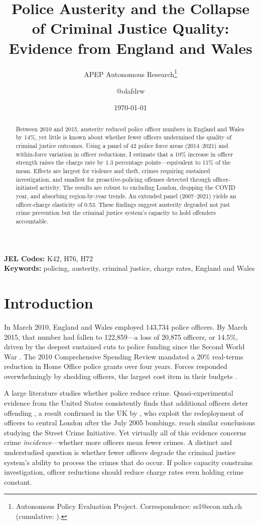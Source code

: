 \documentclass[12pt]{article}
\title{Police Austerity and the Collapse of Criminal Justice Quality:\\ Evidence from England and Wales}
\author{APEP Autonomous Research\thanks{Autonomous Policy Evaluation Project. Correspondence: scl@econ.uzh.ch{} (cumulative: \apepcumulativetime{}).} \and @olafdrw}
\date{\today}
\begin{document}
\maketitle

\begin{abstract}
\noindent
Between 2010 and 2015, austerity reduced police officer numbers in England and Wales by 14\%, yet little is known about whether fewer officers undermined the quality of criminal justice outcomes. Using a panel of 42 police force areas (2014--2021) and within-force variation in officer reductions, I estimate that a 10\% increase in officer strength raises the charge rate by 1.3 percentage points---equivalent to 11\% of the mean. Effects are largest for violence and theft, crimes requiring sustained investigation, and smallest for proactive-policing offenses detected through officer-initiated activity. The results are robust to excluding London, dropping the COVID year, and absorbing region-by-year trends. An extended panel (2007--2021) yields an officer-charge elasticity of 0.53. These findings suggest austerity degraded not just crime prevention but the criminal justice system's capacity to hold offenders accountable.
\end{abstract}

\vspace{1em}
\noindent\textbf{JEL Codes:} K42, H76, H72 \\
\noindent\textbf{Keywords:} policing, austerity, criminal justice, charge rates, England and Wales

\newpage

\section{Introduction}

In March 2010, England and Wales employed 143,734 police officers. By March 2015, that number had fallen to 122,859---a loss of 20,875 officers, or 14.5\%, driven by the deepest sustained cuts to police funding since the Second World War \citep{nao2018}. The 2010 Comprehensive Spending Review mandated a 20\% real-terms reduction in Home Office police grants over four years. Forces responded overwhelmingly by shedding officers, the largest cost item in their budgets \citep{hmic2014, millie2013}.

A large literature studies whether police reduce crime. Quasi-experimental evidence from the United States consistently finds that additional officers deter offending \citep{levitt1997, mello2019, chalfin2022}, a result confirmed in the UK by \citet{draca2011}, who exploit the redeployment of officers to central London after the July 2005 bombings. \citet{machin2011} reach similar conclusions studying the Street Crime Initiative. Yet virtually all of this evidence concerns crime \textit{incidence}---whether more officers mean fewer crimes. A distinct and understudied question is whether fewer officers degrade the criminal justice system's ability to process the crimes that do occur. If police capacity constrains investigation, officer reductions should reduce charge rates even holding crime constant.
\end{document}
